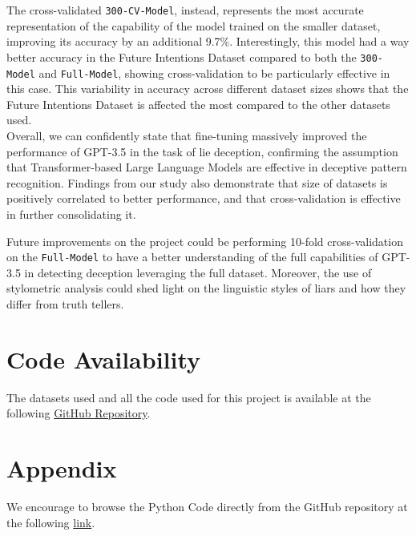 \documentclass[10pt,twocolumn,letterpaper]{article}
\begin{document}
The cross-validated \texttt{300-CV-Model}, instead, represents the most accurate representation of the capability of the model trained
on the smaller dataset, improving its accuracy by an additional 9.7\%. Interestingly, this model had a way better accuracy
in the Future Intentions Dataset compared to both the \texttt{300-Model} and \texttt{Full-Model}, showing cross-validation to be particularly
effective in this case. This variability in accuracy across different dataset sizes shows that the Future Intentions Dataset is affected the 
most compared to the other datasets used. \\

Overall, we can confidently state that fine-tuning massively improved the performance of GPT-3.5 in the task of lie deception,
confirming the assumption that Transformer-based Large Language Models are effective in deceptive pattern recognition. Findings
from our study also demonstrate that size of datasets is positively correlated to better performance, and that cross-validation
is effective in further consolidating it.

Future improvements on the project could be performing 10-fold cross-validation on the \texttt{Full-Model} to have a better understanding
of the full capabilities of GPT-3.5 in detecting deception leveraging the full dataset. Moreover, the use of stylometric analysis could shed
light on the linguistic styles of liars and how they differ from truth tellers.

\section{Code Availability}
The datasets used and all the code used for this project is available
at the following \href{https://github.com/TannerAGraves/GPT-LieDetection/}{GitHub Repository}.



{\small


}

\clearpage %
\onecolumn %

\section{Appendix}
\label{sec:appendix}

We encourage to browse the Python Code directly from the GitHub repository at the following \href{https://github.com/TannerAGraves/GPT-LieDetection/}{link}.
\end{document}
